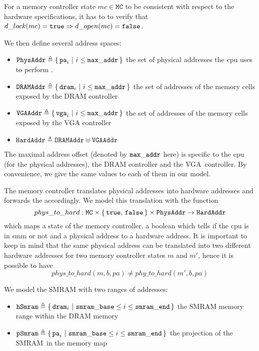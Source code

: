 For a memory controller state $mc \in \texttt{MC}$ to be consistent with respect
to the hardware specifications, it has to to verify that
$d\_lock(mc) = \mathtt{true} \Rightarrow d\_open(mc) = \mathtt{false}$.

We then define several address spaces:
%
\begin{itemize}
\item $\texttt{PhysAddr} \triangleq \{\,\mathtt{pa}_i\ |\ i \leq \mathtt{max\_addr}\,\}$
  the set of physical addresses the \ac{cpu} uses to perform \IO.
%
\item
  $\texttt{DRAMAddr} \triangleq \{\,\mathtt{dram}_i\ |\ i \leq \mathtt{max\_addr}\,\}$
  the set of addresses of the memory cells exposed by the DRAM controller
%
\item $\texttt{VGAAddr} \triangleq \{\,\mathtt{vga}_i\ |\ i \leq \mathtt{max\_addr}\,\}$
  the set of addresses of the memory cells exposed by the VGA controller
%
\item $\texttt{HardAddr} \triangleq \texttt{DRAMAddr} \uplus \texttt{VGAAddr}$
\end{itemize}

The maximal address offset (denoted by $\mathtt{max\_addr}$ here) is specific to
the \ac{cpu} (for the physical addresses), the DRAM controller and the
VGA controller. By convenience, we give the same values to each of them in our
model.

The memory controller translates physical addresses into hardware addresses and
forwards the \IO accordingly.
%
We model this translation with the function
%
\[
  phys\_to\_hard : \texttt{MC} \times \{\,\mathtt{true},\,\mathtt{false}\,\}
  \times \texttt{PhysAddr} \rightarrow \texttt{HardAddr}
\]
%
which maps a state of the memory controller, a boolean which tells if the
\ac{cpu} is in \ac{smm} or not and a physical address to a hardware address.
%
It is important to keep in mind that the same physical address can be translated
into two different hardware addresses for two memory controller states $m$ and
$m'$, hence it is possible to have
%
\[
  phys\_to\_hard(m, b, pa) \neq phy\_to\_hard(m', b, pa)
\]

We model the SMRAM with two ranges of addresses:
%
\begin{itemize}
\item
  $\texttt{hSmram} \triangleq \{\,\mathtt{dram}_i\ |\ \mathtt{smram\_base} \leq i \le
    \mathtt{smram\_end}\,\}$ the SMRAM memory range within the DRAM memory
%
\item
  $\texttt{pSmram} \triangleq \{\,\mathtt{pa}_i\ |\ \mathtt{smram\_base} \leq i \le
    \mathtt{smram\_end}\,\}$ the projection of the SMRAM in the memory map
\end{itemize}

